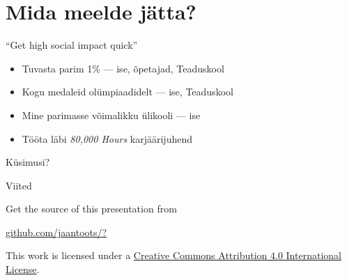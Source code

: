 \documentclass{beamer}
\begin{document}
\section{Mida meelde jätta?}

\begin{frame}{``Get \alert{high social impact} quick''}

  \begin{itemize}
  \item Tuvasta parim 1\% --- ise, õpetajad, Teaduskool
  \item Kogu medaleid olümpiaadidelt --- ise, Teaduskool
  \item Mine parimasse võimalikku ülikooli --- ise
  \item Tööta läbi \emph{80,000 Hours} karjäärijuhend
  \end{itemize}

\end{frame}

\begin{frame}[standout]
  Küsimusi?
\end{frame}

\appendix

\begin{frame}[allowframebreaks]{Viited}

  
  

\end{frame}

\begin{frame}[plain]
  Get the source of this presentation from

  \begin{center}
    \href{https://github.com/jaantoots/?}{github.com/jaantoots/?}
  \end{center}

  This work is licensed under a
  \href{http://creativecommons.org/licenses/by/4.0/}{Creative Commons
    Attribution 4.0 International License}.

  \begin{center}\ccby\end{center}
\end{frame}
\end{document}

